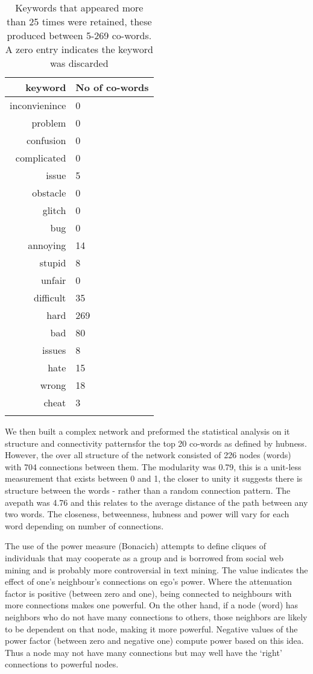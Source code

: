 \documentclass{ewic}
\begin{document}
\begin{table}[h]
\centering \scriptsize
\begin{tabular}{rl}
  \hline
  keyword & No of co-words  \\
  \hline
inconvienince   &        0 \\
problem    &       0\\
 confusion  &         0\\
  complicated     &      0\\
  issue      &     5\\
      obstacle     &      0\\
       glitch       &    0\\
      bug      &     0\\
       annoying   &        14\\
       stupid      &     8\\
       unfair      &     0\\
       difficult     &      35\\
       hard     &      269\\
       bad     &      80\\
       issues  &         8\\
       hate     &      15\\
       wrong   &        18\\
       cheat    &       3\\
   \hline \normalsize
\end{tabular}
\caption{Keywords that appeared more than 25 times were retained, these produced between 5-269 co-words. A zero entry indicates the keyword was discarded}
 \label{keywords}
\end{table}

We then built a complex network and preformed the statistical analysis on it structure and connectivity patternsfor the top 20 co-words as defined by hubness. However, the over all structure of the network consisted of 226 nodes (words) with 704  connections between them. The modularity  was  0.79, this is a unit-less measurement that exists between 0 and 1, the closer to unity it suggests there is structure between the words - rather than a random connection pattern. The avepath was 4.76 and this relates to the average distance of the path between any two words. The closeness, betweenness, hubness and power will vary for each word depending on number of connections. 


The use of the power measure (Bonacich) attempts to define cliques of individuals that may cooperate as a group and is borrowed from social web mining and is probably more controversial in text mining.  The value indicates the effect of one's neighbour's connections on ego's power.  Where the attenuation factor is positive (between zero and one), being connected to neighbours with more connections makes one powerful.  On the other hand, if a node (word) has neighbors who do not have many connections to others, those neighbors are likely to be dependent on that node, making it more powerful.  Negative values of the power factor (between zero and negative one) compute power based on this idea. Thus a node may not have many connections but may well have the `right' connections to powerful nodes.
\end{document}
